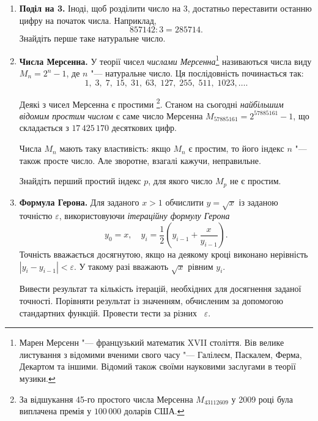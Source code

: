 
\begin{enumerate}
\item \textbf{Поділ на 3.} Іноді, щоб розділити число на 3, достатньо переставити останню цифру на початок числа. Наприклад,
$$
857142: 3 = 285714.
$$
Знайдіть перше таке натуральне число.
\item \textbf{Числа Мерсенна.} У теорії чисел {\itshape числами Мерсенна}\footnote[1]{Марен Мерсенн "--- французький математик XVII століття. Вів велике листування з відомими вченими свого часу "--- Галілеєм, Паскалем, Ферма, Декартом та іншими. Відомий також своїми науковими заслугами в теорії музики.} називаються числа виду $M_n=2^n-1$, де $n$ "--- натуральне число. Ця послідовність починається так:
$$
1,\; 3,\; 7,\; 15,\; 31,\; 63,\; 127,\; 255,\; 511,\; 1023,\ldots.
$$

Деякі з чисел Мерсенна є простими \footnote[2]{За відшукання 45-го простого числа Мерсенна $M_{43112609}$ у 2009 році була виплачена премія у $100\,000$ доларів США.}. Станом на сьогодні {\itshape найбільшим відомим простим числом} є саме число Мерсенна
$M_{57885161}=2^{57885161}-1$, що складається з $ 17 \, 425 \, 170 $ десяткових цифр.

Числа $M_n$ мають таку властивість: якщо $M_n$ є простим, то його індекс $n$ "--- також просте число. Але зворотне, взагалі кажучи, неправильне.

Знайдіть перший простий індекс $p$, для якого число $M_p$ не є простим.

\item \textbf{Формула Герона.} Для заданого $x>1$ обчислити $y=\sqrt{x}$ із заданою точністю $\varepsilon$, використовуючи {\itshape ітераційну формулу Герона}
$$
y_0 = x,\quad y_i = \frac{1}{2}\left(y_{i-1}+\frac{x}{y_{i-1}}\right).
$$
Точність вважається досягнутою, якщо на деякому кроці виконано нерівність $\left|y_{i}-y_{i-1}\right|<\varepsilon$. У такому разі вважають $\sqrt{x}$ рівним $y_i$.

Вивести результат та кількість ітерацій, необхідних для досягнення заданої точності. Порівняти результат із значенням, обчисленим за допомогою стандартних функцій. Провести тести за різних ~$\varepsilon$.
\end{enumerate}




